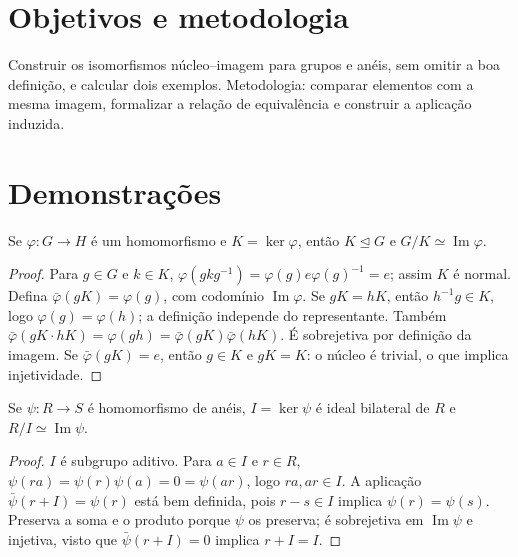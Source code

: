 \documentclass[11pt,a4paper]{article}
\begin{document}
\section{Objetivos e metodologia}
Construir os isomorfismos núcleo--imagem para grupos e anéis, sem omitir a boa definição, e calcular dois exemplos. Metodologia: comparar elementos com a mesma imagem, formalizar a relação de equivalência e construir a aplicação induzida.
\section{Demonstrações}
\begin{teorema}[Grupos]
Se $\varphi:G\to H$ é um homomorfismo e $K=\ker\varphi$, então $K\trianglelefteq G$ e $G/K\simeq\operatorname{Im}\varphi$.
\end{teorema}
\begin{proof}
Para $g\in G$ e $k\in K$, $\varphi(gkg^{-1})=\varphi(g)e\varphi(g)^{-1}=e$; assim $K$ é normal. Defina $\bar\varphi(gK)=\varphi(g)$, com codomínio $\operatorname{Im}\varphi$. Se $gK=hK$, então $h^{-1}g\in K$, logo $\varphi(g)=\varphi(h)$; a definição independe do representante. Também $\bar\varphi(gK\cdot hK)=\varphi(gh)=\bar\varphi(gK)\bar\varphi(hK)$. É sobrejetiva por definição da imagem. Se $\bar\varphi(gK)=e$, então $g\in K$ e $gK=K$: o núcleo é trivial, o que implica injetividade.
\end{proof}
\begin{teorema}[Anéis]
Se $\psi:R\to S$ é homomorfismo de anéis, $I=\ker\psi$ é ideal bilateral de $R$ e $R/I\simeq\operatorname{Im}\psi$.
\end{teorema}
\begin{proof}
$I$ é subgrupo aditivo. Para $a\in I$ e $r\in R$, $\psi(ra)=\psi(r)\psi(a)=0=\psi(ar)$, logo $ra,ar\in I$. A aplicação $\bar\psi(r+I)=\psi(r)$ está bem definida, pois $r-s\in I$ implica $\psi(r)=\psi(s)$. Preserva a soma e o produto porque $\psi$ os preserva; é sobrejetiva em $\operatorname{Im}\psi$ e injetiva, visto que $\bar\psi(r+I)=0$ implica $r+I=I$.
\end{proof}
\end{document}
